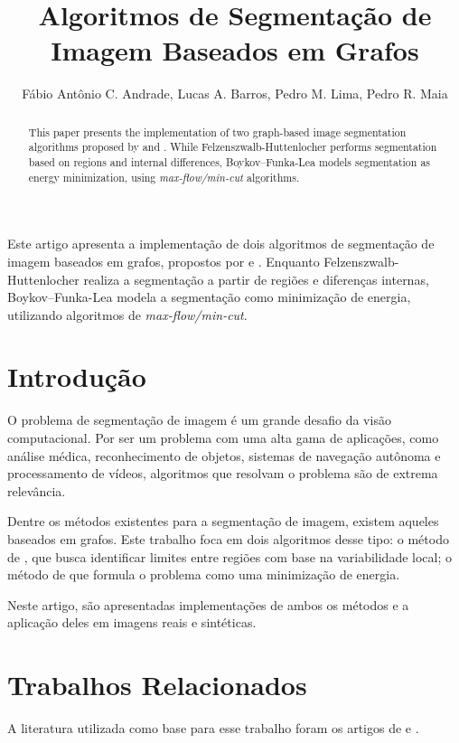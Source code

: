 \documentclass[12pt]{article}
\title{Algoritmos de Segmentação de Imagem Baseados em Grafos}
\author{Fábio Antônio C. Andrade\inst{1}, Lucas A. Barros\inst{1}, Pedro M. Lima\inst{1}, Pedro R. Maia\inst{1} }
\begin{document}
 

\maketitle

\begin{abstract}
  This paper presents the implementation of two graph-based image segmentation algorithms proposed by \cite{Felzenszwalb2004} and \cite{boykov:06}. While Felzenszwalb-Huttenlocher performs segmentation based on regions and internal differences, Boykov--Funka-Lea models segmentation as energy minimization, using \textit{max-flow/min-cut} algorithms.
\end{abstract}
     
\begin{resumo} 
  Este artigo apresenta a implementação de dois algoritmos de segmentação de imagem baseados em grafos, propostos por \cite{Felzenszwalb2004} e \cite{boykov:06}. Enquanto Felzenszwalb-Huttenlocher realiza a segmentação a partir de regiões e diferenças internas, Boykov--Funka-Lea modela a segmentação como minimização de energia, utilizando algoritmos de \textit{max-flow/min-cut}.
\end{resumo}

\section{Introdução} \label{sec:intro}
O problema de segmentação de imagem é um grande desafio da visão computacional. Por ser um problema com uma alta gama de aplicações, como análise médica, reconhecimento de objetos, sistemas de navegação autônoma e processamento de vídeos, algoritmos que resolvam o problema são de extrema relevância.

Dentre os métodos existentes para a segmentação de imagem, existem aqueles baseados em grafos. Este trabalho foca em dois algoritmos desse tipo: o método de \cite{Felzenszwalb2004}, que busca identificar limites entre regiões com base na variabilidade local; o método de \cite{boykov:06} que formula o problema como uma minimização de energia.

Neste artigo, são apresentadas implementações de ambos os métodos e a aplicação deles em imagens reais e sintéticas.

\section{Trabalhos Relacionados} \label{sec:relatedwork}
A literatura utilizada como base para esse trabalho foram os artigos de \cite{Felzenszwalb2004} e \cite{boykov:06}.
\end{document}
